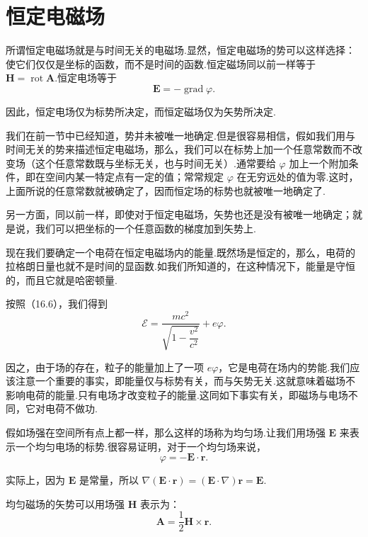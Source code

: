 \section{恒定电磁场}

所谓恒定电磁场就是与时间无关的电磁场.显然，恒定电磁场的势可以这样选择：使它们仅仅是坐标的函数，而不是时间的函数.恒定磁场同以前一样等于
$\boldsymbol{H}=\operatorname{rot}\boldsymbol{A}$.恒定电场等于
\begin{equation}
  \boldsymbol{E}=-\operatorname{grad}\varphi.
\end{equation}

因此，恒定电场仅为标势所决定，而恒定磁场仅为矢势所决定.

我们在前一节中已经知道，势并未被唯一地确定.但是很容易相信，假如我们用与时间无关的势来描述恒定电磁场，那么，我们可以在标势上加一个任意常数而不改变场（这个任意常数既与坐标无关，也与时间无关）.通常要给 $\varphi$ 加上一个附加条件，即在空间内某一特定点有一定的值；常常规定 $\varphi$ 在无穷远处的值为零.这时，上面所说的任意常数就被确定了，因而恒定场的标势也就被唯一地确定了.

另一方面，同以前一样，即使对于恒定电磁场，矢势也还是没有被唯一地确定；就是说，我们可以把坐标的一个任意函数的梯度加到矢势上.

现在我们要确定一个电荷在恒定电磁场内的能量.既然场是恒定的，那么，电荷的拉格朗日量也就不是时间的显函数.如我们所知道的，在这种情况下，能量是守恒的，而且它就是哈密顿量.

按照（16.6），我们得到
\begin{equation}
  \mathcal{E}=\frac{mc^2}{\sqrt{1-\dfrac{v^2}{c^2}}}+e\varphi.
\end{equation}

因之，由于场的存在，粒子的能量加上了一项 $e\varphi$，它是电荷在场内的势能.我们应该注意一个重要的事实，即能量仅与标势有关，而与矢势无关.这就意味着磁场不影响电荷的能量.只有电场才改变粒子的能量.这同如下事实有关，即磁场与电场不同，它对电荷不做功.

假如场强在空间所有点上都一样，那么这样的场称为均匀场.让我们用场强 $\boldsymbol{E}$ 来表示一个均匀电场的标势.很容易证明，对于一个均匀场来说，
\begin{equation}
  \varphi=-\boldsymbol{E}\cdot\boldsymbol{r}.
\end{equation}

实际上，因为 $\boldsymbol{E}$ 是常量，所以
$\nabla\left(\boldsymbol{E}\cdot\boldsymbol{r}\right)
=\left(\boldsymbol{E}\cdot\nabla\right)\boldsymbol{r}=\boldsymbol{E}$.

均匀磁场的矢势可以用场强 $\boldsymbol{H}$ 表示为：
\begin{equation}
  \boldsymbol{A}=\frac{1}{2}\boldsymbol{H}\times\boldsymbol{r}.
\end{equation}

